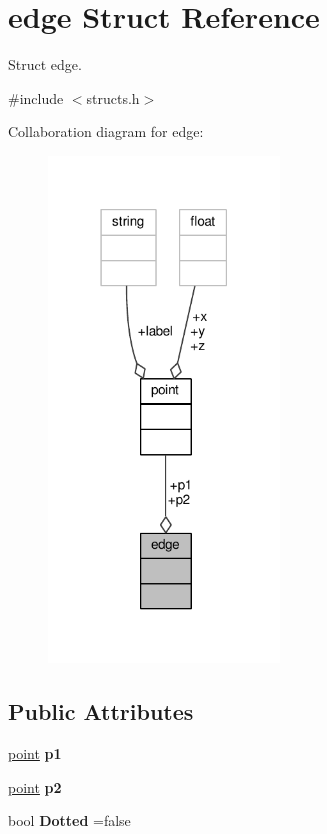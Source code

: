 \hypertarget{structedge}{}\section{edge Struct Reference}
\label{structedge}


Struct edge.  




{\ttfamily \#include $<$structs.\+h$>$}



Collaboration diagram for edge\+:\nopagebreak
\begin{figure}[H]
\begin{center}
\leavevmode
\includegraphics[width=174pt]{structedge__coll__graph}
\end{center}
\end{figure}
\subsection*{Public Attributes}
\begin{DoxyCompactItemize}
\item 
\hyperlink{structpoint}{point} {\bfseries p1}\hypertarget{structedge_a7b074374ee3059d29a93e9e76480274e}{}\label{structedge_a7b074374ee3059d29a93e9e76480274e}

\item 
\hyperlink{structpoint}{point} {\bfseries p2}\hypertarget{structedge_a105ba74e7b01aba7e0e113ab286dc883}{}\label{structedge_a105ba74e7b01aba7e0e113ab286dc883}

\item 
bool {\bfseries Dotted} =false\hypertarget{structedge_ae35774472063d8f38a1ce7b375b39921}{}\label{structedge_ae35774472063d8f38a1ce7b375b39921}

\end{DoxyCompactItemize}


